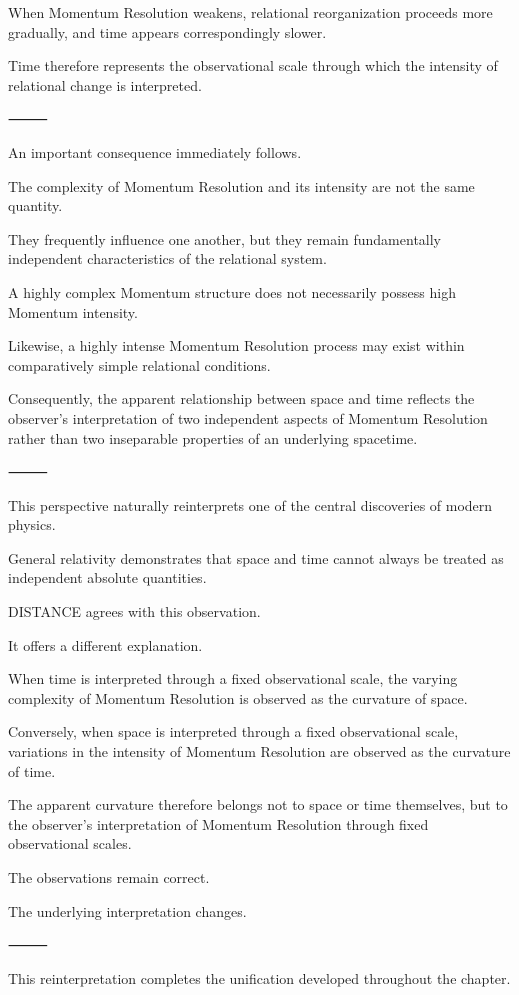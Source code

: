 When Momentum Resolution weakens, relational reorganization proceeds more gradually, and time appears correspondingly slower.

Time therefore represents the observational scale through which the intensity of relational change is interpreted.

⸻

An important consequence immediately follows.

The complexity of Momentum Resolution and its intensity are not the same quantity.

They frequently influence one another, but they remain fundamentally independent characteristics of the relational system.

A highly complex Momentum structure does not necessarily possess high Momentum intensity.

Likewise, a highly intense Momentum Resolution process may exist within comparatively simple relational conditions.

Consequently, the apparent relationship between space and time reflects the observer’s interpretation of two independent aspects of Momentum Resolution rather than two inseparable properties of an underlying spacetime.

⸻

This perspective naturally reinterprets one of the central discoveries of modern physics.

General relativity demonstrates that space and time cannot always be treated as independent absolute quantities.

DISTANCE agrees with this observation.

It offers a different explanation.

When time is interpreted through a fixed observational scale, the varying complexity of Momentum Resolution is observed as the curvature of space.

Conversely, when space is interpreted through a fixed observational scale, variations in the intensity of Momentum Resolution are observed as the curvature of time.

The apparent curvature therefore belongs not to space or time themselves, but to the observer’s interpretation of Momentum Resolution through fixed observational scales.

The observations remain correct.

The underlying interpretation changes.

⸻

This reinterpretation completes the unification developed throughout the chapter.


